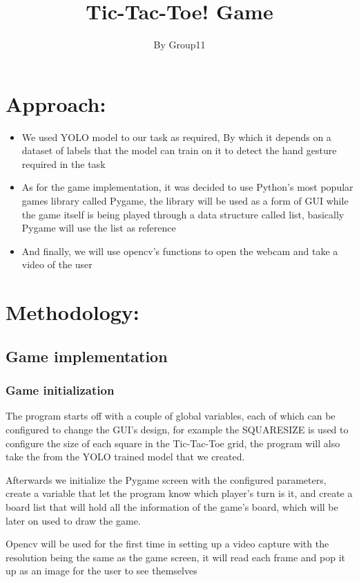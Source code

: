 \documentclass[11pt]{article}
\title{Tic-Tac-Toe! Game}
\author{ By Group11}
\begin{document}
\maketitle
\section{Approach:}
\begin{itemize}
  \item We used YOLO model to our task as required, By which it depends on a dataset of labels that the model can train on it to detect the hand gesture required in the task
  
 \item As for the game implementation, it was decided to use Python's most popular games library called Pygame, the library will be used as a form of GUI while the game itself is being played through a data structure called list, basically Pygame will use the list as reference
 
 \item And finally, we will use opencv's functions to open the webcam and take a video of the user

\end{itemize}
\section{Methodology:}
\subsection{Game implementation}
\subsubsection{Game initialization}

The program starts off with a couple of global variables, each of which can be configured to change the GUI's design, for example the SQUARESIZE is used to configure the size of each square in the Tic-Tac-Toe grid, the program will also take the from the YOLO trained model that we created.


Afterwards we initialize the Pygame screen with the configured parameters, create a variable that let the program know which player's turn is it, and create a board list that will hold all the information of the game's board, which will be later on used to draw the game.

Opencv will be used for the first time in setting up a video capture with the resolution being the same as the game screen, it will read each frame and pop it up as an image for the user to see themselves
\end{document}
